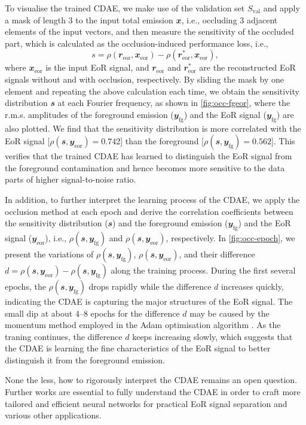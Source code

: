 \documentclass[fleqn,usenatbib]{mnras}
\newcommand{\R}[1]{\mathrm{#1}}
\newcommand{\B}[1]{\mathbfit{#1}}
\begin{document}
{To visualise the trained CDAE, we make use of the validation set
$S_{\R{val}}$ and apply a mask of length 3 to the input total emission
$\B{x}$, i.e., occluding 3 adjacent elements of the input vectors, and then
measure the sensitivity of the occluded part, which is calculated as the
occlusion-induced performance loss, i.e.,
\begin{equation}
  \label{eq:perf-loss}
  s = \rho(\B{r}_{\R{eor}}, \B{x}_{\R{eor}}) -
      \rho(\B{r}^*_{\R{eor}}, \B{x}_{\R{eor}}),
\end{equation}
where $\B{x}_{\R{eor}}$ is the input EoR signal, and
$\B{r}_{\R{eor}}$ and $\B{r}^*_{\R{eor}}$ are the reconstructed EoR signals
without and with occlusion, respectively.
By sliding the mask by one element and repeating the above calculation each
time, we obtain the sensitivity distribution $\B{s}$ at each Fourier
frequency, as shown in \autoref{fig:occ-fgeor}, where the r.m.s\@.
amplitudes of the foreground emission ($\B{y}_{\R{fg}}$) and the EoR signal
($\B{y}_{\R{fg}}$) are also plotted.
We find that the sensitivity distribution is more correlated with the EoR
signal [$\rho(\B{s}, \B{y}_{\R{eor}}) = 0.742$] than the foreground
[$\rho(\B{s}, \B{y}_{\R{fg}}) = 0.562$].
This verifies that the trained CDAE has learned to distinguish the EoR
signal from the foreground contamination and hence becomes more sensitive
to the data parts of higher signal-to-noise ratio.

In addition, to further interpret the learning process of the CDAE, we
apply the occlusion method at each epoch and derive the correlation
coefficients between the sensitivity distribution ($\B{s}$) and the
foreground emission ($\B{y}_{\R{fg}}$) and the EoR signal
($\B{y}_{\R{eor}}$), i.e., $\rho(\B{s}, \B{y}_{\R{fg}})$ and
$\rho(\B{s}, \B{y}_{\R{eor}})$, respectively.
In \autoref{fig:occ-epoch}, we present the variations of
$\rho(\B{s}, \B{y}_{\R{fg}})$, $\rho(\B{s}, \B{y}_{\R{eor}})$, and their
difference $d = \rho(\B{s}, \B{y}_{\R{eor}}) - \rho(\B{s}, \B{y}_{\R{fg}})$
along the training process.
During the first several epochs, the $\rho(\B{s}, \B{y}_{\R{fg}})$ drops
rapidly while the difference $d$ increases quickly, indicating the CDAE is
capturing the major structures of the EoR signal.
The small dip at about \numrange{4}{8} epochs for the difference $d$ may be
caused by the momentum method employed in the Adam optimisation algorithm
\citep{kingma2015}.
As the traning continues, the difference $d$ keeps increasing slowly, which
suggests that the CDAE is learning the fine characteristics of the EoR
signal to better distinguish it from the foreground emission.

None the less, how to rigorously interpret the CDAE remains an open
question.
Further works are essential to fully understand the CDAE in order to craft
more tailored and efficient neural networks for practical EoR signal
separation and various other applications.
} %
\end{document}
